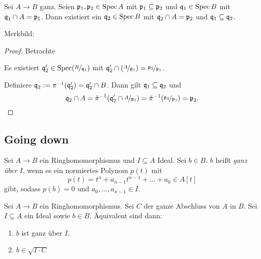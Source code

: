 \documentclass[12pt,a4paper]{scrartcl}
\theoremstyle{cplain}
\theoremstyle{cdef}
\begin{document}
\begin{satz}[Going up] \label{thm:going up}
	Sei $A\to B$ ganz. Seien $\mathfrak{p}_1,\mathfrak{p}_2\in \operatorname{Spec} A$ mit $\mathfrak{p}_1\subseteq \mathfrak{p}_2$ und $\mathfrak{q}_1\in \operatorname{Spec} B$ mit $\mathfrak{q}_1\cap A = \mathfrak{p}_1$. Dann existiert ein $\mathfrak{q}_2\in \operatorname{Spec} B$ mit $\mathfrak{q}_2\cap A = \mathfrak{p}_2$ und $\mathfrak{q}_1\subseteq \mathfrak{q}_2$.

	Merkbild:
	\begin{center}
	\end{center}
\end{satz}
\begin{proof}
	Betrachte \begin{center}
	\end{center}
	Es existiert $\mathfrak{q}_2'\in\operatorname{Spec} (\nicefrac{B}{\mathfrak{q}_1})$ mit $\mathfrak{q}_2'\cap(\nicefrac{A}{\mathfrak{p}_1}) = \nicefrac{\mathfrak{p}_2}{\mathfrak{p}_1}$.
	
	Definiere $\mathfrak{q}_2 := \pi^{-1}(\mathfrak{q}_2') = \mathfrak{q}_2'\cap B$. Dann gilt $\mathfrak{q}_1\subseteq \mathfrak{q}_2$ und
	\[\mathfrak{q}_2\cap A = \tilde{\pi}^{-1}(\mathfrak{q}_2'\cap \nicefrac{A}{\mathfrak{p}_1}) = \tilde{\pi}^{-1}(\nicefrac{\mathfrak{p}_2}{\mathfrak{p}_1}) = \mathfrak{p}_2.\qedhere\]
\end{proof}

\subsection{Going down}
\begin{defi}
	Sei $A\to B$ ein Ringhomomorphismus und $I\subseteq A$ Ideal. Sei $b\in B$. $b$ heißt \emph{ganz über $I$}, wenn es ein normiertes Polynom $p(t)$ mit
	\[p(t) = t^n+a_{n-1}t^{n-1}+\dots + a_0\in A[t]\]
	gibt, sodass $p(b) = 0$ und $a_0,\dots, a_{n-1}\in I$.
\end{defi}
\begin{lem} \label{lem:6.11}
	Sei $A\to B$ ein Ringhomomorphismus. Sei $C$ der ganze Abschluss von $A$ in $B$. Sei $I\subseteq A$ ein Ideal sowie $b\in B$. Äquivalent sind dann:
	\begin{enumerate}
		\item $b$ ist ganz über $I$. \label{lem:6.11:i}
		\item $b\in \sqrt{I\cdot C}$ \label{lem:6.11:ii}
	\end{enumerate}
\end{lem}
\end{document}

